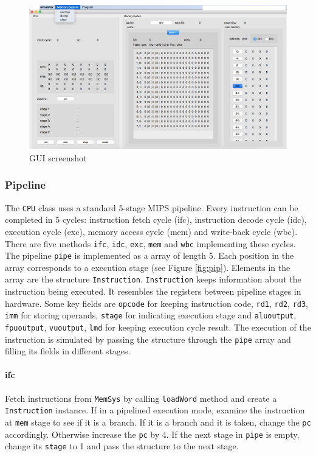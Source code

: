 \documentclass{sig-alternate}
\begin{document}
\begin{figure}[!ht]
\centering
\includegraphics[width = 0.7\linewidth,keepaspectratio]{gui}
\caption{GUI screenshot}
\label{fig:gui}
\end{figure}

\subsubsection{Pipeline}
The \texttt{CPU} class uses a standard 5-stage MIPS pipeline. Every instruction can be completed in 5 cycles: instruction fetch cycle (ifc), instruction decode cycle (idc), execution cycle (exc), memory access cycle (mem) and write-back cycle (wbc). There are five methods \texttt{ifc}, \texttt{idc}, \texttt{exc}, \texttt{mem} and \texttt{wbc} implementing these cycles. The pipeline \texttt{pipe} is implemented as a array of length 5. Each position in the array corresponds to a execution stage (see Figure \ref{fig:pip}). Elements in the array are the structure \texttt{Instruction}. \texttt{Instruction} keeps information about the instruction being executed. It resembles the registers between pipeline stages in hardware. Some key fields are \texttt{opcode} for keeping instruction code, \texttt{rd1}, \texttt{rd2}, \texttt{rd3}, \texttt{imm} for storing operands, \texttt{stage} for indicating execution stage and \texttt{aluoutput}, \texttt{fpuoutput}, \texttt{vuoutput}, \texttt{lmd} for keeping execution cycle result. The execution of the instruction is simulated by passing the structure through the \texttt{pipe} array and filling its fields in different stages. 

\paragraph{ifc}
Fetch instructions from \texttt{MemSys} by calling \texttt{loadWord} method and create a \texttt{Instruction} instance. If in a pipelined execution mode, examine the instruction at \texttt{mem} stage to see if it is a branch. If it is a branch and it is taken, change the \texttt{pc} accordingly. Otherwise increase the \texttt{pc} by 4. If the next stage in \texttt{pipe} is empty, change its \texttt{stage} to 1 and pass the structure to the next stage.  
\end{document}
